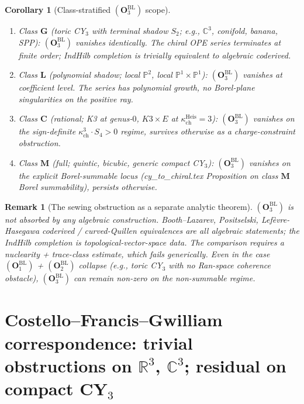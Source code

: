 \documentclass[11pt]{amsart}
\newtheorem{corollary}[theorem]{Corollary}
\newtheorem{remark}[theorem]{Remark}
\newcommand{\kch}{\kappa_{\mathrm{ch}}}
\newcommand{\bP}{\mathbb{P}}
\newcommand{\bC}{\mathbb{C}}
\newcommand{\bR}{\mathbb{R}}
\begin{document}
\begin{corollary}[Class-stratified $(\mathbf{O}_3^{\mathrm{BL}})$ scope]
\label{cor:O3-class-stratified}
\begin{enumerate}[leftmargin=2em]
\item \emph{Class $\mathbf{G}$} (toric CY$_3$ with terminal shadow
$S_2$; e.g., $\bC^3$, conifold, banana, SPP):
$(\mathbf{O}_3^{\mathrm{BL}})$ vanishes identically. The chiral
OPE series terminates at finite order; IndHilb completion is
trivially equivalent to algebraic coderived.
\item \emph{Class $\mathbf{L}$} (polynomial shadow; local $\bP^2$,
local $\bP^1 \times \bP^1$): $(\mathbf{O}_3^{\mathrm{BL}})$ vanishes
at coefficient level. The series has polynomial growth, no
Borel-plane singularities on the positive ray.
\item \emph{Class $\mathbf{C}$} (rational; K3 at genus-$0$, $K3 \times E$
at $\kch^{\mathrm{Heis}} = 3$): $(\mathbf{O}_3^{\mathrm{BL}})$
vanishes on the sign-definite $\kch^3 \cdot S_4 > 0$ regime, survives
otherwise as a charge-constraint obstruction.
\item \emph{Class $\mathbf{M}$} (full; quintic, bicubic, generic
compact CY$_3$): $(\mathbf{O}_3^{\mathrm{BL}})$ vanishes on the
explicit Borel-summable locus (cy\_to\_chiral.tex Proposition on
class $\mathbf{M}$ Borel summability), persists otherwise.
\end{enumerate}
\end{corollary}

\begin{remark}[The sewing obstruction as a separate analytic theorem]
$(\mathbf{O}_3^{\mathrm{BL}})$ is not absorbed by any algebraic
construction. Booth--Lazarev, Positselski, Lef\`evre-Hasegawa
coderived / curved-Quillen equivalences are all algebraic
statements; the IndHilb completion is topological-vector-space
data. The comparison requires a nuclearity + trace-class
estimate, which fails generically. Even in the case
$(\mathbf{O}_1^{\mathrm{BL}})$ + $(\mathbf{O}_2^{\mathrm{BL}})$
collapse (e.g., toric CY$_3$ with no Ran-space coherence
obstacle), $(\mathbf{O}_3^{\mathrm{BL}})$ can remain non-zero
on the non-summable regime.
\end{remark}

\section{Costello--Francis--Gwilliam correspondence: trivial obstructions
on $\bR^3$, $\bC^3$; residual on compact CY$_3$}
\label{sec:cfg-correspondence}
\end{document}
